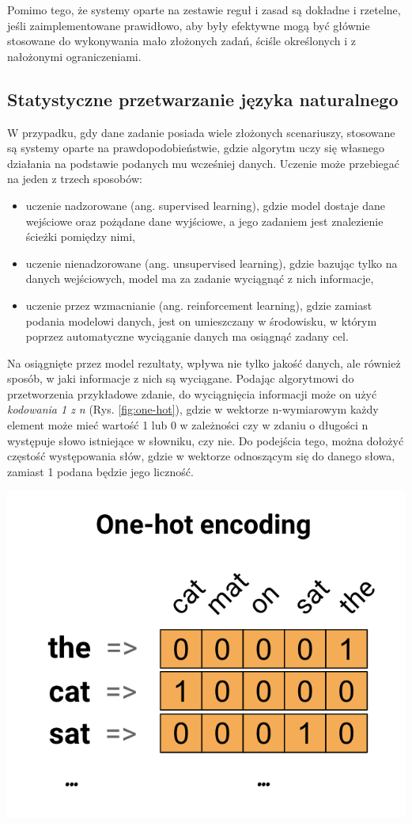 Pomimo tego, że systemy oparte na zestawie reguł i zasad są dokładne i rzetelne, jeśli zaimplementowane prawidłowo, aby były efektywne mogą być głównie stosowane do wykonywania mało złożonych zadań, ściśle określonych i z nałożonymi ograniczeniami. 


\subsection{Statystyczne przetwarzanie języka naturalnego}
\label{subsec:statistyc}

W przypadku, gdy dane zadanie posiada wiele złożonych scenariuszy, stosowane są systemy oparte na prawdopodobieństwie, gdzie algorytm uczy się własnego działania na podstawie podanych mu wcześniej danych. Uczenie może przebiegać na jeden z trzech sposobów: 
\begin{itemize}
    \item uczenie nadzorowane (ang. supervised learning), gdzie model dostaje dane wejściowe oraz pożądane dane wyjściowe, a jego zadaniem jest znalezienie ścieżki pomiędzy nimi,
    \item uczenie nienadzorowane (ang. unsupervised learning), gdzie bazując tylko na danych wejściowych, model ma za zadanie wyciągnąć z nich informacje, 
    \item uczenie przez wzmacnianie (ang. reinforcement learning), gdzie zamiast podania modelowi danych, jest on umieszczany w środowisku, w którym poprzez automatyczne wyciąganie danych ma osiągnąć zadany cel. 
\end{itemize}

Na osiągnięte przez model rezultaty, wpływa nie tylko jakość danych, ale również sposób, w jaki informacje z nich są wyciągane. Podając algorytmowi do przetworzenia przykładowe zdanie, do wyciągnięcia informacji może on użyć \textit{kodowania 1 z n} (Rys. \ref{fig:one-hot}), gdzie w wektorze n-wymiarowym każdy element może mieć wartość 1 lub 0 w zależności czy w zdaniu o długości n występuje słowo istniejące w słowniku, czy nie. Do podejścia tego, można dołożyć częstość występowania słów, gdzie w wektorze odnoszącym się do danego słowa, zamiast 1 podana będzie jego liczność. 

\begin{center}
    \includegraphics[width=0.6\linewidth]{files/one-hot.png}
    \label{fig:one-hot}
\end{center}

